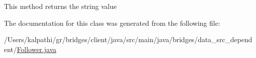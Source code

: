 This method returns the string value 

The documentation for this class was generated from the following file\+:\begin{DoxyCompactItemize}
\item 
/\+Users/kalpathi/gr/bridges/client/java/src/main/java/bridges/data\+\_\+src\+\_\+dependent/\mbox{\hyperlink{_follower_8java}{Follower.\+java}}\end{DoxyCompactItemize}
